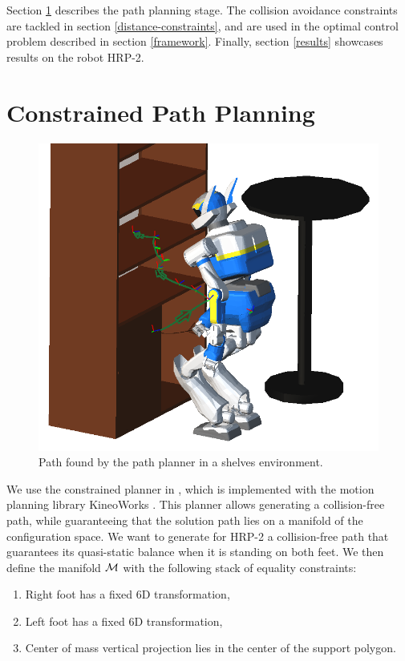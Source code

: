Section \ref{path-planning} describes the path planning stage. The
collision avoidance constraints are tackled in section
\ref{distance-constraints}, and are used in the optimal control
problem described in section \ref{framework}. Finally, section
\ref{results} showcases results on the robot HRP-2.

\section{Constrained Path Planning}
\label{path-planning}

\begin{figure}
\centering
\includegraphics[width=0.8\linewidth]
                {src/chap3-optimal-motion-planning/figure/shelves-path.png}
\caption{Path found by the path planner in a shelves environment.}
\label{path}
\end{figure}

We use the constrained planner in \cite{dali09}, which is
implemented with the motion planning library KineoWorks\texttrademark
\cite{Laumond2006}. This planner allows generating a collision-free
path, while guaranteeing that the solution path lies on a manifold of
the configuration space. We want to generate for HRP-2 a
collision-free path that guarantees its quasi-static balance when it
is standing on both feet. We then define the manifold $\mathcal{M}$
with the following stack of equality constraints:

\begin{enumerate}
  \item Right foot has a fixed 6D transformation,
  \item Left foot has a fixed 6D transformation,
  \item Center of mass vertical projection lies in the center of the
    support polygon.
\end{enumerate}

